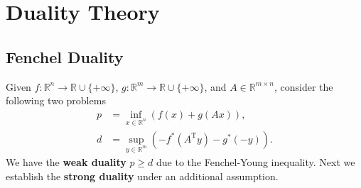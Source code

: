 \documentclass[openany]{book}
\theoremstyle{definition}
\theoremstyle{remark}
\begin{document}
\chapter{Duality Theory}
\section{Fenchel Duality}
Given $f:\mathbb{R}^n\to \mathbb{R}\cup\{+\infty\}$, $g:\mathbb{R}^m\to \mathbb{R}\cup\{+\infty\}$, and $A\in \mathbb{R}^{m\times n}$, consider the following two problems
\begin{align}
    p & =\inf_{x\in \mathbb{R}^n}\left(f(x)+g(Ax)\right), \label{FenchelPrimal}\\
    d & =\sup_{y\in \mathbb{R}^m}\left(-f^*(A^{\mathrm{T}}y)-g^*(-y)\right). \label{FenchelDual}
\end{align}
We have the \textbf{weak duality} $p\ge d$ due to the Fenchel-Young inequality. Next we establish the \textbf{strong duality} under an additional assumption.
\end{document}
